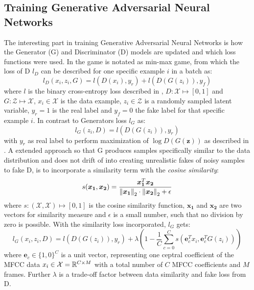 \subsection{Training Generative Adversarial Neural Networks}
The interesting part in training Generative Adversarial Neural Networks is how the Generator (G) and Discriminator (D) models are updated and which loss functions were used.
In  the game is notated as min-max game, from which the loss of D $l_D$ can be described for one specific example $i$ in a batch as:
\begin{equation}
  l_D(x_i, z_i, G) = l(D(x_i), y_r) + l(D(G(z_i)), y_f)
\end{equation}
where $l$ is the binary cross-entropy loss described in , $D: \mathcal{X} \mapsto [0, 1]$ and $G: \mathcal{Z} \mapsto \mathcal{X}$, $x_i \in \mathcal{X}$ is the data example, $z_i \in \mathcal{Z}$ is a randomly sampled latent variable, $y_r = 1$ is the real label and $y_f = 0$ the fake label for that specific example $i$.
In contrast to Generators loss $l_G$ as:
\begin{equation}
  l_G(z_i, D) =  l(D(G(z_i)), y_r)
\end{equation}
with $y_r$ as real label to perform maximization of $\log D(G(\bm{z}))$ as described in .
A extended approach so that G produces samples specifically similar to the data distribution and does not drift of into creating unrealistic fakes of noisy samples to fake D, is to incorporate a similarity term with the \emph{cosine similarity}:
\begin{equation}
  s(\bm{x_1}, \bm{x_2}) = \frac{\bm{x_1}^T \bm{x_2}}{\norm{\bm{x_1}}_2 \cdot \norm{\bm{x_2}}_2 + \epsilon} 
\end{equation}
where $s : (\mathcal{X}, \mathcal{X}) \mapsto [0, 1]$ is the cosine similarity function, $\bm{x_1}$ and $\bm{x_2}$ are two vectors for similarity measure and $\epsilon$ is a small number, such that no division by zero is possible.
With the similarity loss incorporated, $l_G$ gets:
\begin{equation}
  l_G(x_i, z_i, D) =  l(D(G(z_i)), y_r) + \lambda \left(1 - \frac{1}{C} \sum_{c=0}^{C} s(\bm{e}_c^T x_i , \bm{e}_c^T G(z_i)) \right)
\end{equation}
where $\bm{e}_c \in \{1, 0\}^C$ is a unit vector, representing one ceptral coefficient of the MFCC data $x_i \in \mathcal{X} = \mathbb{R}^{C \times M}$
with a total number of $C$ MFCC coefficients and $M$ frames.
Further $\lambda$ is a trade-off factor between data similarity and fake loss from D.


